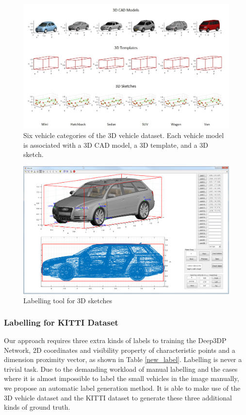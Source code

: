 \documentclass[a4paper,12pt]{article}
\begin{document}
\begin{figure}[H]		
	\includegraphics[width=1\textwidth]{vehicle_dataset.jpg}
	\caption[3D vehicle dataset]{Six vehicle categories of the 3D vehicle dataset. Each vehicle model is associated with a 3D CAD model, a 3D template, and a 3D sketch.}
	\centering
	\label{figure:vehicle_dataset}
\end{figure}

\begin{figure}[H]		
	\includegraphics[width=1\textwidth]{label_cad.png}
	\caption{Labelling tool for 3D sketches}
	\centering
	\label{figure:label_cad}
\end{figure}

\subsubsection{Labelling for KITTI Dataset}

Our approach requires three extra kinds of labels to training the Deep3DP Network, \ie 2D coordinates and visibility property of characteristic points and a dimension proximity vector, as shown in Table \ref{new_label}.  Labelling is never a trivial task. Due to the demanding workload of manual labelling and the cases where it is almost impossible to label the small vehicles in the image manually, we propose an automatic label generation method. It is able to make use of the 3D vehicle dataset and the KITTI dataset to generate these three additional kinds of ground truth.
\end{document}
